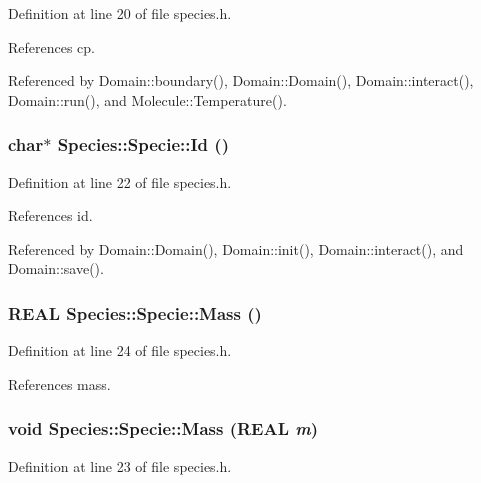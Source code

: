 Definition at line 20 of file species.h.

References cp.

Referenced by Domain::boundary(), Domain::Domain(), Domain::interact(), Domain::run(), and Molecule::Temperature().\hypertarget{classSpecies_1_1Specie_85a82dc9d3c0ec3512fb0b2269891c0e}{
\subsubsection[{Id}]{\setlength{\rightskip}{0pt plus 5cm}char$\ast$ Species::Specie::Id ()}}
\label{classSpecies_1_1Specie_85a82dc9d3c0ec3512fb0b2269891c0e}




Definition at line 22 of file species.h.

References id.

Referenced by Domain::Domain(), Domain::init(), Domain::interact(), and Domain::save().\hypertarget{classSpecies_1_1Specie_b852816083703c3b3c193113f582a101}{
\subsubsection[{Mass}]{\setlength{\rightskip}{0pt plus 5cm}REAL Species::Specie::Mass ()}}
\label{classSpecies_1_1Specie_b852816083703c3b3c193113f582a101}




Definition at line 24 of file species.h.

References mass.\hypertarget{classSpecies_1_1Specie_7d0beb858e64e8618cdea316c7d3e76b}{
\subsubsection[{Mass}]{\setlength{\rightskip}{0pt plus 5cm}void Species::Specie::Mass (REAL {\em m})}}
\label{classSpecies_1_1Specie_7d0beb858e64e8618cdea316c7d3e76b}




Definition at line 23 of file species.h.

